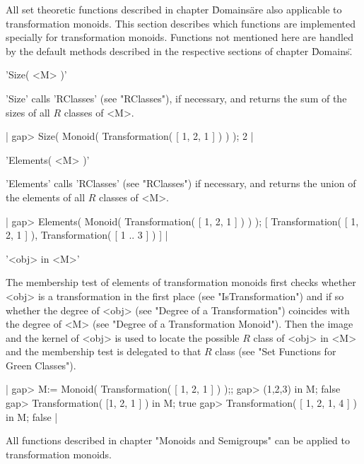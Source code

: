 All set theoretic  functions described in   chapter \"Domains\" are  also
applicable  to transformation  monoids.    This section  describes  which
functions are implemented specially for transformation monoids. Functions
not mentioned here  are handled by the default  methods  described in the
respective sections of chapter \"Domains\".

'Size( <M> )'%

'Size'  calls 'RClasses' (see "RClasses"),  if necessary, and returns the
sum of the sizes of all $R$ classes of <M>.

|    gap> Size( Monoid( Transformation( [ 1, 2, 1 ] ) ) );
    2 |

\vspace{5mm}
'Elements( <M> )'

'Elements' calls  'RClasses' (see "RClasses")  if necessary,  and returns
the union of the elements of all $R$ classes of <M>.

|    gap> Elements( Monoid( Transformation( [ 1, 2, 1 ] ) ) );
    [ Transformation( [ 1, 2, 1 ] ), Transformation( [ 1 .. 3 ] ) ] |

\vspace{5mm}
'<obj> in <M>'%
%

The  membership test of elements of  transformation  monoids first checks
whether  <obj>  is    a    transformation  in the   first     place  (see
"IsTransformation") and if so whether the degree of <obj> (see "Degree of
a Transformation") coincides  with the  degree of <M>  (see "Degree  of a
Transformation Monoid").  Then the image and  the kernel of <obj> is used
to locate the possible $R$ class of <obj> in  <M> and the membership test
is delegated to that $R$ class (see "Set Functions for Green Classes").

|   gap> M:= Monoid( Transformation( [ 1, 2, 1 ] ) );;
    gap> (1,2,3) in M;
    false
    gap> Transformation( [1, 2, 1 ] ) in M;
    true
    gap> Transformation( [ 1, 2, 1, 4 ] ) in M;
    false | 


All  functions   described in chapter   "Monoids  and Semigroups"  can be
applied to transformation monoids.

